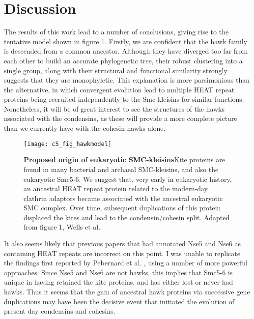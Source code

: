 \documentclass[a4paper,11pt,twoside,openright]{scrbook}
\begin{document}
\clearpage

\section{Discussion}

The results of this work lead to a number of conclusions, giving rise to the tentative model shown in figure \ref{figure:hawkmodel}. Firstly, we are confident that the hawk family is descended from a common ancestor. Although they have diverged too far from each other to build an accurate phylogenetic tree, their robust clustering into a single group, along with their structural and functional similarity strongly suggests that they are monophyletic. This explanation is more parsimonious than the alternative, in which convergent evolution lead to multiple HEAT repeat proteins being recruited independently to the Smc-kleisins for similar functions. Nonetheless, it will be of great interest to see the structures of the hawks associated with the condensins, as these will provide a more complete picture than we currently have with the cohesin hawks alone.

\begin{figure}[h]
\fcapsideright
    {\caption[Proposed origin of eukaryotic SMC-kleisins]{\sffamily\textbf{Proposed origin of eukaryotic SMC-kleisins}\newline \small Kite proteins are found in many bacterial and archaeal SMC-kleisins, and also the eukaryotic Smc5-6. We suggest that, very early in eukaryotic history, an ancestral HEAT repeat protein related to the modern-day clathrin adaptors became associated with the ancestral eukaryotic SMC complex. Over time, subsequent duplications of this protein displaced the kites and lead to the condensin/cohesin split. Adapted from figure 1, Wells et al. \cite{Wells2017}}\label{figure:hawkmodel}}
    {\texttt{[image: c5\_fig\_hawkmodel]}}
\end{figure}

It also seems  likely that previous papers that had annotated Nse5 and Nse6 as containing HEAT repeats are incorrect on this point. I was unable to replicate the findings first reported by Pebernard et al. \cite{Pebernard2006}, using a number of more powerful approaches. Since Nse5 and Nse6 are not hawks, this implies that Smc5-6 is unique in having retained the kite proteins, and has either lost or never had hawks. Thus it seems that the gain of ancestral hawk proteins via successive gene duplications may have been the decisive event that initiated the evolution of present day condensins and cohesins.
\end{document}

